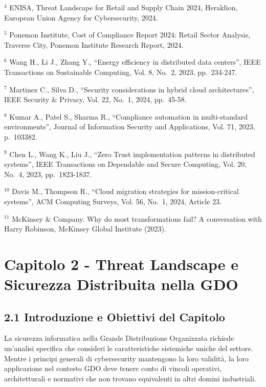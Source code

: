 \documentclass[12pt,a4paper,oneside]{book}
\numberwithin{figure}{chapter} %
\numberwithin{table}{chapter}  %
\begin{document}
$^4$ ENISA, Threat Landscape for Retail and Supply Chain 2024, Heraklion,
European Union Agency for Cybersecurity, 2024.

$^5$ Ponemon Institute, Cost of Compliance Report 2024: Retail Sector
Analysis, Traverse City, Ponemon Institute Research Report, 2024.

$^6$ Wang H., Li J., Zhang Y., ``Energy efficiency in distributed data
centers'', IEEE Transactions on Sustainable Computing, Vol. 8, No.~2,
2023, pp.~234-247.

$^7$ Martinez C., Silva D., ``Security considerations in hybrid cloud
architectures'', IEEE Security \& Privacy, Vol. 22, No.~1, 2024,
pp.~45-58.

$^8$ Kumar A., Patel S., Sharma R., ``Compliance automation in
multi-standard environments'', Journal of Information Security and
Applications, Vol. 71, 2023, p.~103382.

$^9$ Chen L., Wang K., Liu J., ``Zero Trust implementation patterns in
distributed systems'', IEEE Transactions on Dependable and Secure
Computing, Vol. 20, No.~4, 2023, pp.~1823-1837.

$^{10}$ Davis M., Thompson R., ``Cloud migration strategies for
mission-critical systems'', ACM Computing Surveys, Vol. 56, No.~1, 2024,
Article 23.

$^{11}$ McKinsey \& Company. Why do most transformations fail? A conversation
with Harry Robinson, McKinsey Global Institute (2023).

\chapter{Capitolo 2 - Threat Landscape e Sicurezza Distribuita nella
GDO}\label{capitolo-2---threat-landscape-e-sicurezza-distribuita-nella-gdo}

\section{2.1 Introduzione e Obiettivi del
Capitolo}\label{introduzione-e-obiettivi-del-capitolo}

La sicurezza informatica nella Grande Distribuzione Organizzata richiede
un'analisi specifica che consideri le caratteristiche sistemiche uniche
del settore. Mentre i principi generali di cybersecurity mantengono la
loro validità, la loro applicazione nel contesto GDO deve tenere conto
di vincoli operativi, architetturali e normativi che non trovano
equivalenti in altri domini industriali.
\end{document}
